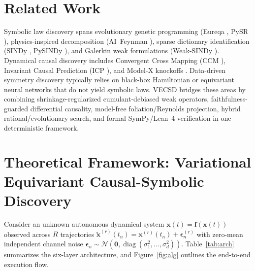 \documentclass[10pt]{article} %
\begin{document}
\section{Related Work}
Symbolic law discovery spans evolutionary genetic programming (Eureqa \citep{schmidt2009distilling}, PySR \citep{cranmer2023pysr}), physics-inspired decomposition (AI~Feynman \citep{udrescu2020ai}), sparse dictionary identification (SINDy \citep{brunton2016discovering}, PySINDy \citep{desilva2020pysindy}), and Galerkin weak formulations (Weak-SINDy \citep{messenger2021weak}). Dynamical causal discovery includes Convergent Cross Mapping (CCM \citep{sugihara2012detecting}), Invariant Causal Prediction (ICP \citep{peters2016causal}), and Model-X knockoffs \citep{candes2018panning}. Data-driven symmetry discovery typically relies on black-box Hamiltonian or equivariant neural networks that do not yield symbolic laws. VECSD bridges these areas by combining shrinkage-regularized cumulant-debiased weak operators, faithfulness-guarded differential causality, model-free foliation/Reynolds projection, hybrid rational/evolutionary search, and formal SymPy/Lean~4 verification in one deterministic framework.

\section{Theoretical Framework: Variational Equivariant Causal-Symbolic Discovery}
Consider an unknown autonomous dynamical system $\dot{\mathbf{x}}(t) = \mathbf{f}(\mathbf{x}(t))$ observed across $R$ trajectories $\tilde{\mathbf{x}}^{(r)}(t_n) = \mathbf{x}^{(r)}(t_n) + \boldsymbol{\epsilon}_n^{(r)}$ with zero-mean independent channel noise $\boldsymbol{\epsilon}_n \sim \mathcal{N}(\mathbf{0}, \operatorname{diag}(\sigma_1^2,\dots,\sigma_d^2))$. Table~\ref{tab:arch} summarizes the six-layer architecture, and Figure~\ref{fig:alg} outlines the end-to-end execution flow.
\end{document}
